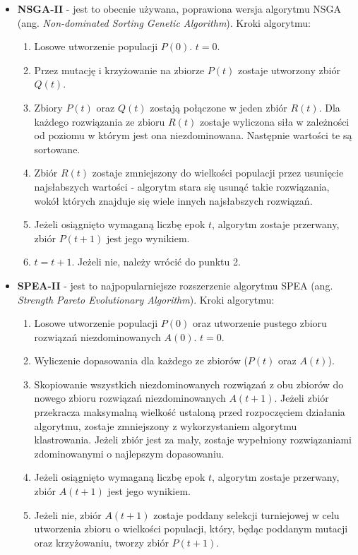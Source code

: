 \documentclass{classrep}
\begin{document}
\begin{itemize}
    \item \textbf{NSGA-II} - jest to obecnie używana, poprawiona wersja algorytmu NSGA (ang. \textit{Non-dominated Sorting Genetic Algorithm}). Kroki algorytmu:
    \begin{enumerate}
        \item Losowe utworzenie populacji $P(0)$. $t = 0$. 
        \item Przez mutację i krzyżowanie na zbiorze $P(t)$ zostaje utworzony zbiór $Q(t)$.
        \item Zbiory $P(t)$ oraz $Q(t)$ zostają połączone w jeden zbiór $R(t)$. Dla każdego rozwiązania ze zbioru $R(t)$ zostaje wyliczona siła w zależności od poziomu w którym jest ona niezdominowana. Następnie wartości te są sortowane.
        \item Zbiór $R(t)$ zostaje zmniejszony do wielkości populacji przez usunięcie najsłabszych wartości - algorytm stara się usunąć takie rozwiązania, wokół których znajduje się wiele innych najsłabszych rozwiązań.
        \item Jeżeli osiągnięto wymaganą liczbę epok $t$, algorytm zostaje przerwany, zbiór $P(t+1)$ jest jego wynikiem.
        \item $t = t + 1$. Jeżeli nie, należy wrócić do punktu 2.
    \end{enumerate}
    \cite{CleverAlgs}\cite{NSGA}
    \item \textbf{SPEA-II} - jest to najpopularniejsze rozszerzenie algorytmu SPEA (ang. \textit{Strength Pareto Evolutionary Algorithm}). Kroki algorytmu:
    \begin{enumerate}
        \item Losowe utworzenie populacji $P(0)$ oraz utworzenie pustego zbioru rozwiązań niezdominowanych $A(0)$. $t = 0$. 
        \item Wyliczenie dopasowania dla każdego ze zbiorów ($P(t)$ oraz $A(t)$).
        \item Skopiowanie wszystkich niezdominowanych rozwiązań z obu zbiorów do nowego zbioru rozwiązań niezdominowanych $A(t+1)$. Jeżeli zbiór przekracza maksymalną wielkość ustaloną przed rozpoczęciem działania algorytmu, zostaje zmniejszony z wykorzystaniem algorytmu klastrowania. Jeżeli zbiór jest za mały, zostaje wypełniony rozwiązaniami zdominowanymi o najlepszym dopasowaniu.
        \item Jeżeli osiągnięto wymaganą liczbę epok $t$, algorytm zostaje przerwany, zbiór $A(t+1)$ jest jego wynikiem.
        \item Jeżeli nie, zbiór $A(t+1)$ zostaje poddany selekcji turniejowej w celu utworzenia zbioru o wielkości populacji, który, będąc poddanym mutacji oraz krzyżowaniu, tworzy zbiór $P(t+1)$.

\end{enumerate}
\end{itemize}
\end{document}
